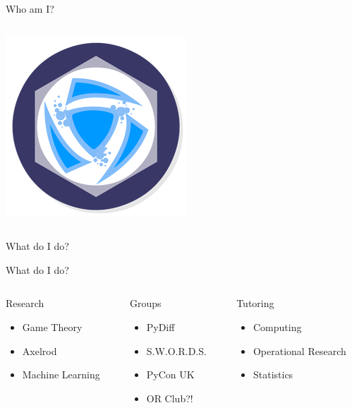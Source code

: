 \documentclass{beamer}
\begin{document}
\begin{frame}{Who am I?}
\begin{columns}[T]
\begin{column}{.38\textwidth}
  		\includegraphics[width=.30\textwidth]{static/hots_logo.jpg}
\end{column}%
\end{columns}
\end{frame}

\begin{frame}
	\begin{center}
		\huge{What do I do?}
	\end{center}
\end{frame}

\begin{frame}{What do I do?}
\begin{columns}
    \begin{column}{0.30\textwidth}
        \begin{block}{Research}
    {
        \begin{itemize}
        \item Game Theory
        \item Axelrod
        \item Machine Learning
        \end{itemize}
    }
    \end{block}
    \end{column}
    \begin{column}{0.30\textwidth}
        \begin{block}{Groups}
    {
        \begin{itemize}
        \item PyDiff
        \item S.W.O.R.D.S.
        \item PyCon UK
        \item OR Club?!
        \end{itemize}
    }
    \end{block}
    \end{column}
    \begin{column}{0.30\textwidth}
        \begin{block}{Tutoring}
    {
        \begin{itemize}
        \item Computing
        \item Operational Research
        \item Statistics
        \end{itemize}
    }
    \end{block}
    \end{column}   
\end{columns}    
\end{frame}
\end{document}
